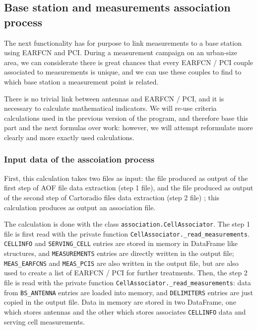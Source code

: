 \documentclass[a4paper, 11pt]{report}
\begin{document}
    \subsection{Base station and measurements association process}
    
    The next functionality has for purpose to link measurements to a base station using EARFCN and PCI. During a measurement campaign on an urban-size area, we can considerate there is great chances that every EARFCN / PCI couple associated to measurements is unique, and we can use these couples to find to which base station a measurement point is related. \newline
    
    There is no trivial link between antennas and EARFCN / PCI, and it is necessary to calculate mathematical indicators. We will re-use criteria calculations used in the previous version of the program, and therefore base this part and the next formulas over \cite{trieu_visualization_2019}
    work: however, we will attempt reformulate more clearly and more exactly used calculations. \newline
    
    \subsubsection{Input data of the asscoiation process}
    
    First, this calculation takes two files as input: the file produced as output of the first step of AOF file data extraction (step 1 file), and the file produced as output of the second step of Cartoradio files data extraction (step 2 file) ; this calculation produces as output an association file. \newline
    
    The calculation is done with the class \texttt{association.CellAssociator}. The step 1 file is first read with the private function \texttt{CellAssociator.\_read\_measurements}. \texttt{CELLINFO} and \texttt{SERVING\_CELL} entries are stored in memory in DataFrame like structures, and \texttt{MEASUREMENTS} entries are directly written in the output file; \texttt{MEAS\_EARFCNS} and \texttt{MEAS\_PCIS} are also written in the output file, but are also used to create a list of EARFCN / PCI for further treatments. Then, the step 2 file is read with the private function \texttt{CellAssociator.\_read\_measurements}: data from \texttt{BS\_ANTENNA} entries are loaded into memory, and \texttt{DELIMITERS} entries are just copied in the output file.
    Data in memory are stored in two DataFrame, one which stores antennas and the other which stores associates \texttt{CELLINFO} data and serving cell measurements.\newline
    
\end{document}

